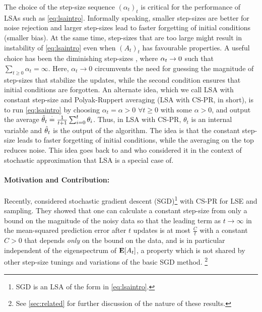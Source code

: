The choice of the step-size sequence $(\alpha_t)_t$ is critical for the performance of LSAs such as \eqref{eq:lsaintro}.
Informally speaking, smaller step-sizes are better for noise rejection and larger step-sizes lead to faster forgetting of initial conditions (smaller bias). At the same time, step-sizes that are too large might result in instability of \eqref{eq:lsaintro} even when $(A_t)_t$ has favourable properties. 
A useful choice has been the diminishing step-sizes \cite{gtd2,gtdmp,konda-tsitsiklis}, where $\alpha_t\rightarrow 0$ such that $\sum_{t\geq 0} \alpha_t=\infty$. Here, $\alpha_t\to0$ circumvents the need for guessing the magnitude of step-sizes that stabilize the updates, while the second condition ensures that initial conditions are forgotten. 
An alternate idea, which we call LSA with constant step-size and Polyak-Ruppert averaging (LSA with CS-PR, in short), is to run \eqref{eq:lsaintro} by choosing $\alpha_t=\alpha>0$ $\forall t\geq 0$ with some $\alpha>0$, and output the average $\hat{\theta}_t\stackrel{\cdot}{=}\frac{1}{t+1}\sum_{i=0}^t \theta_i$. Thus, in LSA with CS-PR, $\theta_t$ is an internal variable and $\hat{\theta}_t$ is the output of the algorithm. The idea is that the constant step-size leads to faster forgetting of initial conditions, while the averaging on the top
reduces noise.
This idea goes back to  \citet{ruppert} and \citet{polyak-judisky} who considered it in the context of stochastic approximation that LSA is a special case of. 
\paragraph{Motivation and Contribution:} Recently, \citet{bach} considered stochastic gradient descent (SGD)\footnote{SGD is an LSA of the form in \eqref{eq:lsaintro}.} with CS-PR for LSE and \iid sampling. They showed that one can calculate a constant step-size from only a bound on the magnitude of the noisy data so that the leading term as $t\to\infty$
 in the mean-squared prediction error after $t$ updates is at most $\frac{C}{t}$ with a constant $C>0$ that depends \emph{only} on the bound on the data, and is in particular independent of the eigenspectrum of $\mathbf{E}[A_t]$, a property which is not shared by other step-size tunings and variations of the basic SGD method.%
 \footnote{See \cref{sec:related} for further discussion of the nature of these results.}

